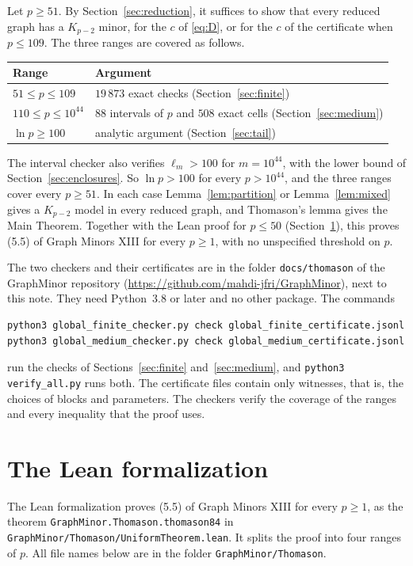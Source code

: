 \documentclass[11pt]{article}
\begin{document}
Let $p\ge51$. By Section~\ref{sec:reduction}, it suffices to show that every
reduced graph has a $K_{p-2}$ minor, for the $c$ of \eqref{eq:D}, or for the
$c$ of the certificate when $p\le109$. The three ranges are covered as
follows.
\begin{center}
\begin{tabular}{ll}
\toprule
Range & Argument\\
\midrule
$51\le p\le109$ & $19\,873$ exact checks (Section~\ref{sec:finite})\\
$110\le p\le10^{44}$ & $88$ intervals of $p$ and $508$ exact cells (Section~\ref{sec:medium})\\
$\ln p\ge100$ & analytic argument (Section~\ref{sec:tail})\\
\bottomrule
\end{tabular}
\end{center}
The interval checker also verifies $\ell_m>100$ for $m=10^{44}$, with the
lower bound of Section~\ref{sec:enclosures}. So $\ln p>100$ for every
$p>10^{44}$, and the three ranges cover every $p\ge51$. In each case
Lemma~\ref{lem:partition} or Lemma~\ref{lem:mixed} gives a $K_{p-2}$ model in
every reduced graph, and Thomason's lemma gives the Main Theorem. Together
with the Lean proof for $p\le50$ (Section~\ref{sec:lean}), this proves (5.5)
of Graph Minors XIII for every $p\ge1$, with no unspecified threshold on $p$.

The two checkers and their certificates are in the folder
\texttt{docs/thomason} of the GraphMinor repository
(\url{https://github.com/mahdi-jfri/GraphMinor}), next to this note. They
need Python~3.8 or later and no other package. The commands
\begin{verbatim}
python3 global_finite_checker.py check global_finite_certificate.jsonl
python3 global_medium_checker.py check global_medium_certificate.jsonl
\end{verbatim}
run the checks of Sections~\ref{sec:finite} and~\ref{sec:medium}, and
\texttt{python3 verify\_all.py} runs both. The certificate files contain only
witnesses, that is, the choices of blocks and parameters. The checkers verify
the coverage of the ranges and every inequality that the proof uses.

\section{The Lean formalization}\label{sec:lean}

The Lean formalization proves (5.5) of Graph Minors XIII for every $p\ge1$,
as the theorem \texttt{GraphMinor.Thomason.thomason84} in
\texttt{GraphMinor/Thomason/UniformTheorem.lean}. It splits the proof into
four ranges of $p$. All file names below are in the folder
\texttt{GraphMinor/Thomason}.
\end{document}
